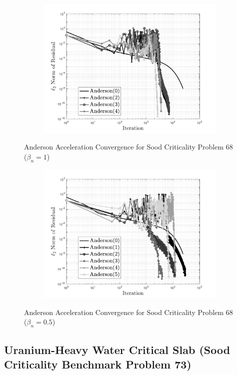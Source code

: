 \begin{figure}[!htbp]
\centering
\begin{subfigure}{\textwidth}
  \centering
  \includegraphics[width=.75\linewidth]{Figures/AndersonAcceleration/SoodProb68_FPI1}
\end{subfigure}
\caption{Anderson Acceleration Convergence for Sood Criticality Problem 68 ($\beta_{n} = 1$)}
\label{fig:AASoodProb68}
\end{figure}

\begin{figure}[!htbp]
\centering
\begin{subfigure}{\textwidth}
  \centering
  \includegraphics[width=.75\linewidth]{Figures/AndersonAcceleration/SoodProb68_FPI1_HalfBeta}
\end{subfigure}
\caption{Anderson Acceleration Convergence for Sood Criticality Problem 68 ($\beta_{n} = 0.5$)}
\label{fig:AASoodProb68HalfBeta}
\end{figure}

\clearpage

\subsection{Uranium-Heavy Water Critical Slab (Sood Criticality Benchmark Problem 73)}

